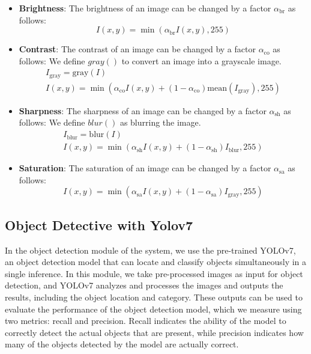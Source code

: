 \documentclass{PHlab-thesis}
\begin{document}
\begin{itemize}
\item \textbf{Brightness}: The brightness of an image can be changed by a factor $\alpha_{\text{br}}$ as follows:
\begin{equation*}
I(x,y)=\min(\alpha_{\text{br}} I(x,y),255)
\end{equation*}

\item \textbf{Contrast}: The contrast of an image can be changed by a factor $\alpha_{\text{co}}$ as follows: We define $gray()$ to convert an image into a grayscale image.
\begin{gather*}
I_{\text{gray}}=\text{gray}(I)\\
I(x,y)=\min(\alpha_{\text{co}} I(x,y)+(1-\alpha_{\text{co}})\text{mean}(I_{\text{gray}}),255)
\end{gather*}

\item \textbf{Sharpness}: The sharpness of an image can be changed by a factor $\alpha_{\text{sh}}$ as follows: We define $blur()$ as blurring the image.
\begin{gather*}
I_{\text{blur}}=\text{blur}(I) \\
I(x,y)=\min(\alpha_{\text{sh}} I(x,y)+(1-\alpha_{\text{sh}})I_{\text{blur}},255)
\end{gather*}

\clearpage
\item \textbf{Saturation}: The saturation of an image can be changed by a factor $\alpha_{\text{sa}}$ as follows:
\begin{equation*}
I(x,y)=\min(\alpha_{\text{sa}} I(x,y)+(1-\alpha_{\text{sa}})I_{\text{gray}},255)
\end{equation*}
\end{itemize}

\subsection{Object Detective with Yolov7}
In the object detection module of the system, we use the pre-trained YOLOv7, an object detection model that can locate and classify objects simultaneously in a single inference. In this module, we take pre-processed images as input for object detection, and YOLOv7 analyzes and processes the images and outputs the results, including the object location and category. These outputs can be used to evaluate the performance of the object detection model, which we measure using two metrics: recall and precision. Recall indicates the ability of the model to correctly detect the actual objects that are present, while precision indicates how many of the objects detected by the model are actually correct.
\end{document}
